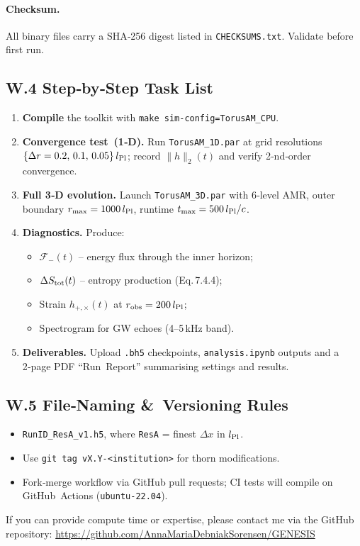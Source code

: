\documentclass{article}
\begin{document}
\paragraph{Checksum.}
All binary files carry a SHA‑256 digest listed in \texttt{CHECKSUMS.txt}.  
Validate before first run.

\subsection*{W.4  Step‑by‑Step Task List}
\begin{enumerate}[label=\textbf{T\arabic*}.,leftmargin=13mm]
\item \textbf{Compile} the toolkit with \texttt{make sim-config=TorusAM\_CPU}.
\item \textbf{Convergence test (1‑D).}  
      Run \texttt{TorusAM\_1D.par} at grid resolutions  
      $\{\Delta r=0.2,\,0.1,\,0.05\}\,l_{\rm Pl}$;  
      record $\|h\|_2(t)$ and verify 2‑nd‑order convergence.
\item \textbf{Full 3‑D evolution.}  
      Launch \texttt{TorusAM\_3D.par} with 6‑level AMR, outer boundary  
      $r_{\max}=1000\,l_{\rm Pl}$, runtime $t_{\max}=500\,l_{\rm Pl}/c$.
\item \textbf{Diagnostics.}  
      Produce:
      \begin{itemize}
        \item $\mathcal{F}_{-}(t)$ – energy flux through the inner horizon;
        \item $\Delta S_{\rm tot}(t)$ – entropy production (Eq.\,7.4.4);
        \item Strain $h_{+,\times}(t)$ at $r_{\rm obs}=200\,l_{\rm Pl}$;
        \item Spectrogram for GW echoes (4–5 kHz band).
      \end{itemize}
\item \textbf{Deliverables.}  
      Upload \texttt{.bh5} checkpoints, \texttt{analysis.ipynb} outputs and a  
      2‑page PDF “Run Report” summarising settings and results.
\end{enumerate}

\subsection*{W.5  File‑Naming \& Versioning Rules}
\begin{itemize}
\item \texttt{RunID\_ResA\_v1.h5}, where \texttt{ResA} = finest $\Delta x$ in $l_{\rm Pl}$.
\item Use \texttt{git tag vX.Y‐<institution>} for thorn modifications.
\item Fork‑merge workflow via GitHub pull requests; CI tests will compile on
      GitHub Actions (\texttt{ubuntu‑22.04}).
\end{itemize}
If you can provide compute time or expertise, please contact me via the GitHub repository:  
\url{https://github.com/AnnaMariaDebniakSorensen/GENESIS}
\end{document}
